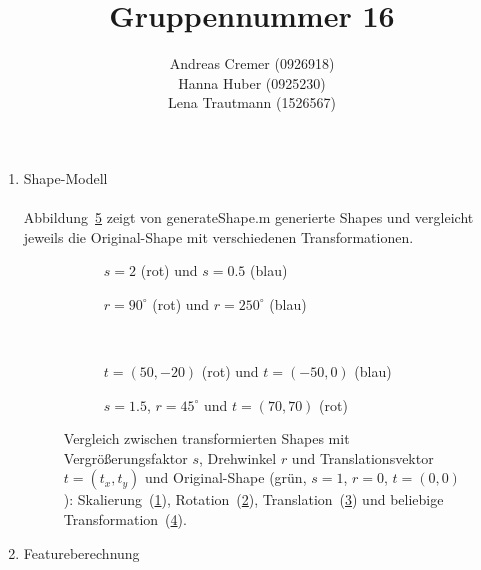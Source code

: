 \documentclass[]{report}
\title{Gruppennummer 16}
\author{Andreas Cremer (0926918)\\Hanna Huber (0925230) \\Lena Trautmann (1526567)}
\newlength\figureheight
\newlength\figurewidth
\begin{document}
	\maketitle
	
	
	\begin{enumerate}
		\item Shape-Modell \\\\
			Abbildung~\ref{fig:trafo} zeigt von generateShape.m generierte Shapes und vergleicht jeweils die Original-Shape mit verschiedenen Transformationen.
			\setlength\figureheight{3.5cm}
			\setlength{}
			\begin{figure}
				\begin{subfigure}{0.45\textwidth}
					\centering
					
					\caption{$s=2$ (rot) und $s=0.5$ (blau)}
					\label{fig:s}
				\end{subfigure}
				\qquad
				\begin{subfigure}{0.45\textwidth}
					\centering
					
					\caption{$r=90^\circ$ (rot) und $r=250^\circ$  (blau)}
					\label{fig:r}
				\end{subfigure}	
				\\
				\begin{subfigure}{0.45\textwidth}
					\centering
					
					\caption{$t=(50,-20)$ (rot) und $t=(-50,0)$ (blau)}
					\label{fig:t}
				\end{subfigure}
				\qquad
				\begin{subfigure}{0.45\textwidth}
					\centering
					
					\caption{$s=1.5$, $r=45^\circ$ und $t=(70,70)$ (rot)}
					\label{fig:mix}
				\end{subfigure}	
				\caption{Vergleich zwischen transformierten Shapes mit Vergrößerungsfaktor $s$, Drehwinkel $r$ und Translationsvektor $t=(t_x,t_y)$ und Original-Shape (grün, $s=1$, $r=0$, $t=(0,0)$): Skalierung~(\ref{fig:s}), Rotation~(\ref{fig:r}), Translation~(\ref{fig:t}) und beliebige Transformation~(\ref{fig:mix}).}
				\label{fig:trafo}
			\end{figure}
			

		\item Featureberechnung
		
		
		

\end{enumerate}
\end{document}
